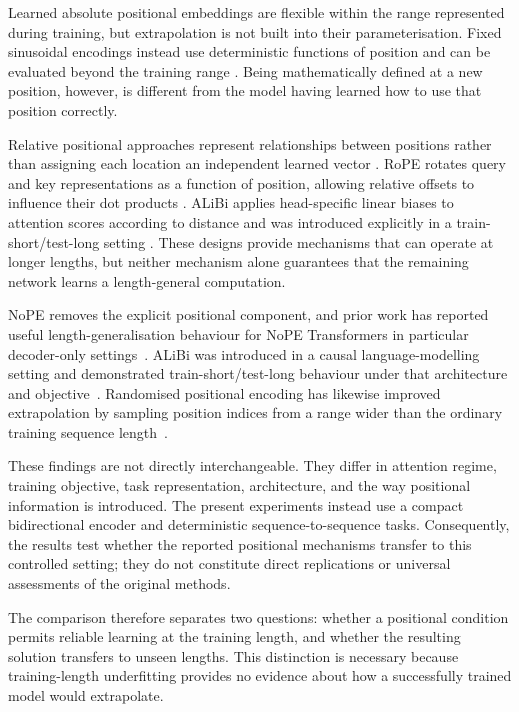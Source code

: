 \documentclass[
    author={Aanchala Ravindra Bhongade},
    supervisor={Dr. Fernando Moreno-Pino},
    degree={MSc},
    title={Length Generalisation in Transformer-Based Sequence Models: Failure Taxonomy and Mitigation Strategies},
    subtitle={},
    type={},
    year={2026}
]{dissertation}
\begin{document}
Learned absolute positional embeddings are flexible within the range
represented during training, but extrapolation is not built into their parameterisation. Fixed sinusoidal encodings instead use deterministic functions of position and can be evaluated beyond the training range \cite{vaswani2017attention}. Being mathematically defined at a new position, however, is different from the model having learned how to use that position correctly.

Relative positional approaches represent relationships between positions rather than assigning each location an independent learned vector \cite{shaw2018relative}. RoPE rotates query and key representations as a function of position, allowing relative offsets to influence their dot products \cite{su2021roformer}. ALiBi applies head-specific linear biases to attention scores according to distance and was introduced explicitly in a train-short/test-long setting \cite{press2022train}. These designs provide mechanisms that can operate at longer lengths, but neither mechanism alone guarantees that the remaining network learns a length-general computation.

NoPE removes the explicit positional component, and prior work has reported useful length-generalisation behaviour for NoPE Transformers in particular decoder-only settings~\cite{kazemnejad2023impact}. ALiBi was introduced in a causal language-modelling setting and demonstrated train-short/test-long behaviour under that architecture and objective~\cite{press2022train}. Randomised positional encoding has likewise improved extrapolation by sampling position indices from a range wider than the ordinary training sequence length~\cite{ruoss2023randomized}.

These findings are not directly interchangeable. They differ in attention regime, training objective, task representation, architecture, and the way positional information is introduced. The present experiments instead use a compact bidirectional encoder and deterministic sequence-to-sequence tasks. Consequently, the results test whether the reported positional mechanisms transfer to this controlled setting; they do not constitute direct replications or universal assessments of the original methods.

The comparison therefore separates two questions: whether a positional condition permits reliable learning at the training length, and whether the resulting solution transfers to unseen lengths. This distinction is necessary because training-length underfitting provides no evidence about how a successfully trained model would extrapolate.
\end{document}
